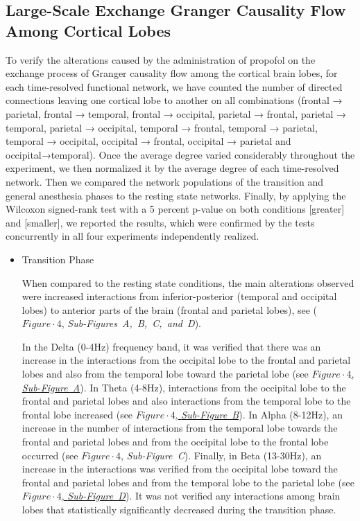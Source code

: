 \documentclass[twoside]{article}
\begin{document}
\begin{multicols}{2}
\subsection{Large-Scale Exchange Granger Causality Flow Among Cortical Lobes}


To verify the alterations caused by the administration of propofol on the exchange process of Granger causality flow among the cortical brain lobes, for each time-resolved functional network, we have counted the number of directed connections leaving one cortical lobe to another on all combinations (frontal → parietal, frontal → temporal, frontal → occipital, parietal → frontal, parietal → temporal, parietal → occipital, temporal → frontal, temporal → parietal, temporal → occipital, occipital → frontal, occipital → parietal and occipital→temporal). Once the average degree varied considerably throughout the experiment, we then normalized it by the average degree of each time-resolved network. Then we compared the network populations of the transition and general anesthesia phases to the resting state networks. Finally, by applying the Wilcoxon signed-rank test with a 5 percent p-value on both conditions [greater] and [smaller], we reported the results, which were confirmed by the tests concurrently in all four experiments independently realized.



\begin{itemize}

\item Transition Phase

When compared to the resting state conditions, the main alterations observed were increased interactions from inferior-posterior (temporal and occipital lobes) to anterior parts of the brain (frontal and parietal lobes), see (\hyperlink{FIGURE4}{$Figure \cdot 4$}, \mbox{\textit{Sub-Figures A, B, C, and D}}).
 
In the Delta (0-4Hz) frequency band, it was verified that there was an increase in the interactions from the occipital lobe to the frontal and parietal lobes and also from the temporal lobe toward the parietal lobe (see \hyperlink{FIGURE4}{$Figure \cdot 4$, \mbox{\textit{Sub-Figure A}}}). In Theta (4-8Hz), interactions from the occipital lobe to the frontal and parietal lobes and also interactions from the temporal lobe to the frontal lobe increased (see \hyperlink{FIGURE4}{$Figure \cdot 4$, \textit{\mbox{Sub-Figure B}}}). In Alpha (8-12Hz), an increase in the number of interactions from the temporal lobe towards the frontal and parietal lobes and from the occipital lobe to the frontal lobe occurred (see \hyperlink{FIGURE4}{$Figure \cdot 4$}, \mbox{\textit{Sub-Figure C}}). Finally, in Beta (13-30Hz), an increase in the interactions was verified from the occipital lobe toward the frontal and parietal lobes and from the temporal lobe to the parietal lobe (see \hyperlink{FIGURE4}{$Figure \cdot 4$, \mbox{\textit{Sub-Figure D}}}).
 It was not verified any interactions among brain lobes that statistically significantly decreased during the transition phase.


\end{itemize}
\end{multicols}
\end{document}
